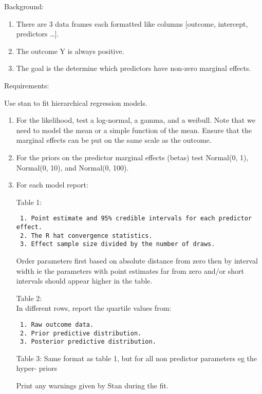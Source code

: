 \documentclass[
  letterpaper,
]{article}
\begin{document}
Background:

\begin{enumerate}
\def\labelenumi{\arabic{enumi}.}
\item
  There are 3 data frames each formatted like columns {[}outcome,
  intercept, predictors \ldots{]}.
\item
  The outcome Y is always positive.
\item
  The goal is the determine which predictors have non-zero marginal
  effects.
\end{enumerate}

Requirements:

Use stan to fit hierarchical regression models.

\begin{enumerate}
\def\labelenumi{\arabic{enumi}.}
\item
  For the likelihood, test a log-normal, a gamma, and a weibull. Note
  that we need to model the mean or a simple function of the mean.
  Ensure that the marginal effects can be put on the same scale as the
  outcome.
\item
  For the priors on the predictor marginal effects (betas) test
  Normal(0, 1), Normal(0, 10), and Normal(0, 100).
\item
  For each model report:

  Table 1:

\begin{verbatim}
 1. Point estimate and 95% credible intervals for each predictor effect. 
 2. The R hat convergence statistics.  
 3. Effect sample size divided by the number of draws.  
\end{verbatim}

  Order parameters first based on absolute distance from zero then by
  interval width ie the parameters with point estimates far from zero
  and/or short intervals should appear higher in the table.

  Table 2:\\
  In different rows, report the quartile values from:

\begin{verbatim}
 1. Raw outcome data.   
 2. Prior predictive distribution. 
 3. Posterior predictive distribution. 
\end{verbatim}

  Table 3: Same format as table 1, but for all non predictor parameters
  eg the hyper- priors

  Print any warnings given by Stan during the fit.
\end{enumerate}
\end{document}
